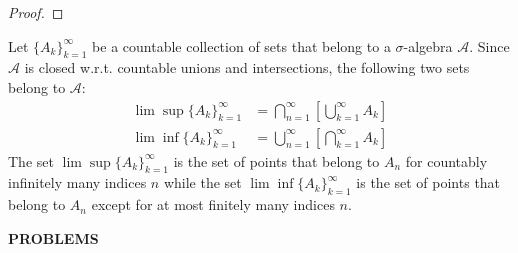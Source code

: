 \begin{flushleft}
\begin{proof}
	\end{proof}
	Let $\{A_k\}_{k=1}^\infty$ be a countable collection of sets that belong to a $\sigma$-algebra $\mathcal{A}$. Since $\mathcal{A}$ is closed w.r.t. countable unions and intersections, the following two sets belong to $\mathcal{A}$:
	\begin{align*}
		\lim\sup\{A_k\}_{k=1}^\infty&=\bigcap_{n=1}^\infty[\bigcup_{k=1}^\infty A_k]\\
		\lim\inf\{A_k\}_{k=1}^\infty&=\bigcup_{n=1}^\infty[\bigcap_{k=1}^\infty A_k]
	\end{align*}
	The set $\lim\sup\{A_k\}_{k=1}^\infty$ is the set of points that belong to $A_n$ for countably infinitely many indices $n$ while the set $\lim\inf\{A_k\}_{k=1}^\infty$ is the set of points that belong to $A_n$ except for at most finitely many indices $n$.
\end{flushleft}
\begin{center}
	\textbf{PROBLEMS}
\end{center}
